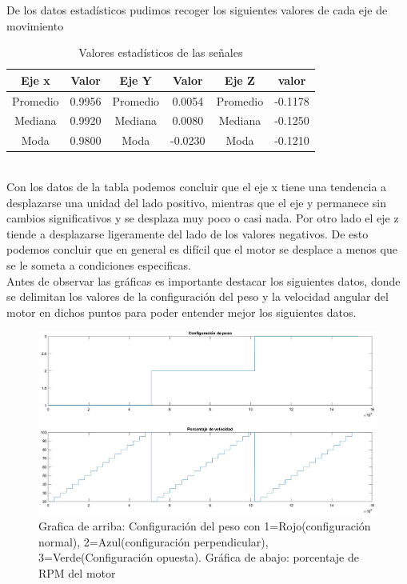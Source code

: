 \documentclass[11pt,a4paper]{article}
\begin{document}
De los datos estadísticos pudimos recoger los siguientes valores de cada eje de movimiento
\begin{table}[h!]
	\centering

	\begin{tabular}{|c|c|c|c|c|c|}
	\hline
	Eje x & Valor & Eje Y & Valor & Eje Z & valor\\
	\hline
	Promedio & 0.9956 & Promedio & 0.0054 & Promedio & -0.1178\\
	\hline
	Mediana & 0.9920 & Mediana & 0.0080 & Mediana & -0.1250\\
	\hline
	Moda & 0.9800 & Moda & -0.0230 & Moda & -0.1210\\ \hline
	\end{tabular}
	\caption{Valores estadísticos de las señales}
	\label{table:1}
\end{table}
\\
Con los datos de la tabla podemos concluir que el eje x tiene una tendencia a desplazarse una unidad del lado positivo, mientras que el eje y permanece sin cambios significativos y se desplaza muy poco o casi nada. Por otro lado el eje z tiende a desplazarse ligeramente del lado de los valores negativos. De esto podemos concluir que en general es difícil que el motor se desplace a menos que se le someta a condiciones especificas.
\\
Antes de observar las gráficas es importante destacar los siguientes datos, donde se delimitan los valores de la configuración del peso y la velocidad angular del motor en dichos puntos para poder entender mejor los siguientes datos.
\begin{figure}[h!]
	\centering
	\includegraphics[scale=0.50]{w_rpm_conf}
	\caption{Grafica de arriba: Configuración del peso con 1=Rojo(configuración normal), 2=Azul(configuración perpendicular), 3=Verde(Configuración opuesta). Gráfica de abajo: porcentaje de RPM del motor}
\end{figure}
\end{document}
